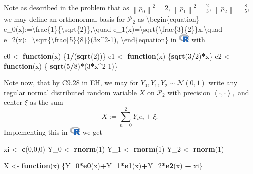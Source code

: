 \documentclass[
]{article}
\newenvironment{Shaded}{\begin{snugshade}}{\end{snugshade}}
\newcommand{\ControlFlowTok}[1]{\textcolor[rgb]{0.13,0.29,0.53}{\textbf{#1}}}
\newcommand{\DecValTok}[1]{\textcolor[rgb]{0.00,0.00,0.81}{#1}}
\newcommand{\KeywordTok}[1]{\textcolor[rgb]{0.13,0.29,0.53}{\textbf{#1}}}
\newcommand{\NormalTok}[1]{#1}
\newcommand{\OperatorTok}[1]{\textcolor[rgb]{0.81,0.36,0.00}{\textbf{#1}}}
\newcommand{\StringTok}[1]{\textcolor[rgb]{0.31,0.60,0.02}{#1}}
\begin{document}
Note as described in the problem that as
\(\left\lVert p_0\right\rVert^2=2,\,\left\lVert p_1\right\rVert^2=\frac{2}{3},\,\left\lVert p_2\right\rVert=\frac{8}{5},\)
we may define an orthonormal basis for \(\mathscr{P}_2\) as
\textbackslash begin\{equation\}
e\_0(x):=\textbackslash frac\{1\}\{\textbackslash sqrt\{2\}\},\textbackslash quad
e\_1(x)=\textbackslash sqrt\{\textbackslash frac\{3\}\{2\}\}x,\textbackslash quad
e\_2(x):=\textbackslash sqrt\{\textbackslash frac\{5\}\{8\}\}(3x\^{}2-1),
\textbackslash end\{equation\} in
\includegraphics[width=\textwidth,height=0.16667in]{R_logo.png} with

\begin{Shaded}
\begin{Highlighting}[]
\NormalTok{e0 <-}\StringTok{ }\ControlFlowTok{function}\NormalTok{(x) \{}\DecValTok{1}\OperatorTok{/}\NormalTok{(}\KeywordTok{sqrt}\NormalTok{(}\DecValTok{2}\NormalTok{))\}}
\NormalTok{e1 <-}\StringTok{ }\ControlFlowTok{function}\NormalTok{(x) \{}\KeywordTok{sqrt}\NormalTok{(}\DecValTok{3}\OperatorTok{/}\DecValTok{2}\NormalTok{)}\OperatorTok{*}\NormalTok{x\}}
\NormalTok{e2 <-}\StringTok{ }\ControlFlowTok{function}\NormalTok{(x) \{ }\KeywordTok{sqrt}\NormalTok{(}\DecValTok{5}\OperatorTok{/}\DecValTok{8}\NormalTok{)}\OperatorTok{*}\NormalTok{(}\DecValTok{3}\OperatorTok{*}\NormalTok{x}\OperatorTok{^}\DecValTok{2-1}\NormalTok{)\}}
\end{Highlighting}
\end{Shaded}

Note now, that by C9.28 in EH, we may for
\(Y_0,Y_1,Y_2\sim\mathcal{N}(0,1)\) write any regular normal distributed
random variable \(X\) on \(\mathscr{P}_2\) with precision
\(\left\langle \cdot, \cdot \right\rangle,\) and center \(\xi\) as the
sum \[X:=\sum_{n=0}^{2}{Y_ie_i}+\xi.\] Implementing this in
\includegraphics[width=\textwidth,height=0.16667in]{R_logo.png} we get

\begin{Shaded}
\begin{Highlighting}[]
\NormalTok{xi <-}\StringTok{ }\KeywordTok{c}\NormalTok{(}\DecValTok{0}\NormalTok{,}\DecValTok{0}\NormalTok{,}\DecValTok{0}\NormalTok{)}
\NormalTok{Y_}\DecValTok{0}\NormalTok{ <-}\StringTok{ }\KeywordTok{rnorm}\NormalTok{(}\DecValTok{1}\NormalTok{)}
\NormalTok{Y_}\DecValTok{1}\NormalTok{ <-}\StringTok{ }\KeywordTok{rnorm}\NormalTok{(}\DecValTok{1}\NormalTok{)}
\NormalTok{Y_}\DecValTok{2}\NormalTok{ <-}\StringTok{ }\KeywordTok{rnorm}\NormalTok{(}\DecValTok{1}\NormalTok{)}

\NormalTok{X <-}\StringTok{ }\ControlFlowTok{function}\NormalTok{(x) \{Y_}\DecValTok{0}\OperatorTok{*}\KeywordTok{e0}\NormalTok{(x)}\OperatorTok{+}\NormalTok{Y_}\DecValTok{1}\OperatorTok{*}\KeywordTok{e1}\NormalTok{(x)}\OperatorTok{+}\NormalTok{Y_}\DecValTok{2}\OperatorTok{*}\KeywordTok{e2}\NormalTok{(x) }\OperatorTok{+}\StringTok{ }\NormalTok{xi\}}
\end{Highlighting}
\end{Shaded}
\end{document}
